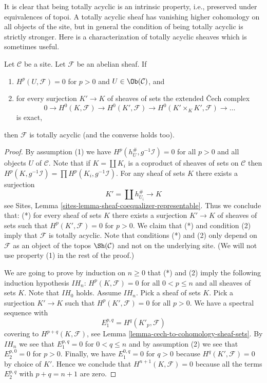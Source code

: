 \noindent
It is clear that being totally acyclic is an intrinsic property, i.e.,
preserved under equivalences of topoi.
A totally acyclic sheaf has vanishing higher cohomology on all objects
of the site, but in general the condition of being totally acyclic
is strictly stronger.
Here is a characterization of totally acyclic sheaves which is sometimes useful.

\begin{lemma}
\label{lemma-characterize-limp}
Let $\mathcal{C}$ be a site. Let $\mathcal{F}$ be an abelian sheaf. If
\begin{enumerate}
\item $H^p(U, \mathcal{F}) = 0$ for $p > 0$ and $U \in \Ob(\mathcal{C})$, and
\item for every surjection $K' \to K$ of sheaves of sets the
extended {\v C}ech complex
$$
0 \to H^0(K, \mathcal{F}) \to H^0(K', \mathcal{F}) \to
H^0(K' \times_K K', \mathcal{F}) \to \ldots
$$
is exact,
\end{enumerate}
then $\mathcal{F}$ is totally acyclic (and the converse holds too).
\end{lemma}

\begin{proof}
By assumption (1) we have $H^p(h_U^\#, g^{-1}\mathcal{I}) = 0$ for all
$p > 0$ and all objects $U$ of $\mathcal{C}$. Note that if
$K = \coprod K_i$ is a coproduct of sheaves of sets on $\mathcal{C}$
then $H^p(K, g^{-1}\mathcal{I}) = \prod H^p(K_i, g^{-1}\mathcal{I})$.
For any sheaf of sets $K$ there exists a surjection
$$
K' = \coprod h_{U_i}^\# \longrightarrow K
$$
see Sites, Lemma \ref{sites-lemma-sheaf-coequalizer-representable}.
Thus we conclude that: (*) for every sheaf of sets $K$ there exists a
surjection $K' \to K$ of sheaves of sets such that $H^p(K', \mathcal{F}) = 0$
for $p > 0$. We claim that (*) and condition (2) imply that $\mathcal{F}$
is totally acyclic.
Note that conditions (*) and (2) only depend on $\mathcal{F}$ as an
object of the topos $\Sh(\mathcal{C})$ and not on the underlying site.
(We will not use property (1) in the rest of the proof.)

\medskip\noindent
We are going to prove by induction on $n \geq 0$ that (*) and (2)
imply the following induction hypothesis $IH_n$:
$H^p(K, \mathcal{F}) = 0$ for all $0 < p \leq n$ and
all sheaves of sets $K$. Note that $IH_0$ holds. Assume $IH_n$. Pick
a sheaf of sets $K$. Pick a surjection $K' \to K$ such that
$H^p(K', \mathcal{F}) = 0$ for all $p > 0$. We have a
spectral sequence with
$$
E_1^{p, q} = H^q(K'_p, \mathcal{F})
$$
covering to $H^{p + q}(K, \mathcal{F})$, see
Lemma \ref{lemma-cech-to-cohomology-sheaf-sets}.
By $IH_n$ we see that $E_1^{p, q} = 0$ for $0 < q \leq n$ and by
assumption (2) we see that $E_2^{p, 0} = 0$ for $p > 0$. Finally, we have
$E_1^{0, q} = 0$ for $q > 0$ because $H^q(K', \mathcal{F}) = 0$ by
choice of $K'$. Hence we conclude that $H^{n + 1}(K, \mathcal{F}) = 0$
because all the terms $E_2^{p, q}$ with $p + q = n + 1$ are zero.
\end{proof}







